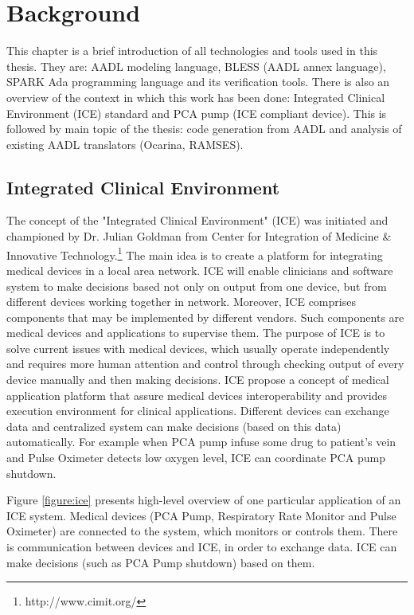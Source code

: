 
\cleardoublepage


\chapter{Background}
\label{background}

This chapter is a brief introduction of all technologies and tools used in this thesis. They are: AADL modeling language, BLESS (AADL annex language), SPARK Ada programming language and its verification tools. There is also an overview of the context in which this work has been done: Integrated Clinical Environment (ICE) standard and PCA pump (ICE compliant device). This is followed by main topic of the thesis: code generation from AADL and analysis of existing AADL translators (Ocarina, RAMSES).



\section{Integrated Clinical Environment}
\label{background:ice}

The concept of the "Integrated Clinical Environment" (ICE) was initiated and championed by Dr. Julian Goldman from Center for Integration of Medicine \& Innovative Technology.\footnote{http://www.cimit.org/} The main idea is to create a platform for integrating medical devices in a local area network. ICE will enable clinicians and software system to make decisions based not only on output from one device, but from different devices working together in network. Moreover, ICE comprises components that may be implemented by different vendors. Such components are medical devices and applications to supervise them. The purpose of ICE is to solve current issues with medical devices, which usually operate independently and requires more human attention and control through checking output of every device manually and then making decisions. ICE propose a concept of medical application platform that assure medical devices interoperability and provides execution environment for clinical applications. Different devices can exchange data and centralized system can make decisions (based on this data) automatically. For example when PCA pump infuse some drug to patient's vein and Pulse Oximeter detects low oxygen level, ICE can coordinate PCA pump shutdown. 

Figure \ref{figure:ice} presents high-level overview of one particular application of an ICE system. Medical devices (PCA Pump, Respiratory Rate Monitor and Pulse Oximeter) are connected to the system, which monitors or controls them. There is communication between devices and ICE, in order to exchange data. ICE can make decisions (such as PCA Pump shutdown) based on them.

